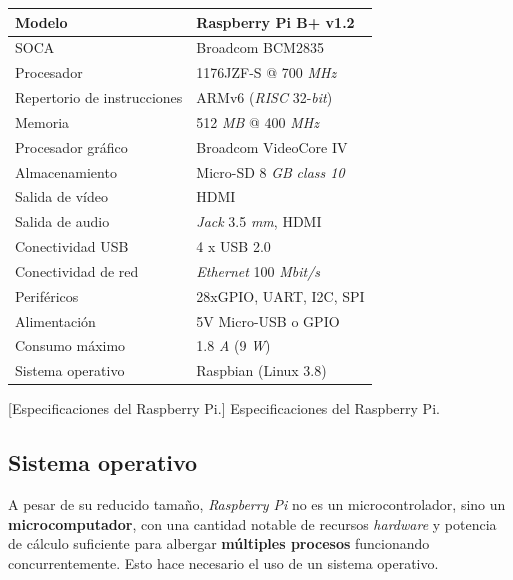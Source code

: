 \begin{center}
	\begin{tabular}{|l|l|}
		\hline Modelo & Raspberry Pi B+ v1.2 \\
		\hline \acrshort{SOCA} & Broadcom BCM2835 \\
		\hline Procesador &  1176JZF-S @ 700 \textit{MHz} \\
		\hline Repertorio de instrucciones & ARMv6 (\textit{RISC} 32-\textit{bit}) \\
		\hline Memoria & 512 \textit{MB} @ 400 \textit{MHz} \\
		\hline Procesador gráfico & Broadcom VideoCore IV \\ 		
		\hline Almacenamiento & Micro-\acrshort{SD} 8 \textit{GB} \textit{class 10} \\
		\hline Salida de vídeo & \acrshort{HDMI} \\
		\hline Salida de audio & \textit{Jack} 3.5 \textit{mm}, \acrshort{HDMI} \\
		\hline Conectividad USB & 4 x \acrshort{USB} 2.0 \\
		\hline Conectividad de red & \textit{Ethernet} 100 \textit{Mbit/s} \\
		\hline Periféricos & 28xGPIO, \acrshort{UART}, \acrshort{I2C}, \acrshort{SPI} \\ 
		\hline Alimentación & 5V Micro-\acrshort{USB} o \acrshort{GPIO} \\
		\hline Consumo máximo & 1.8 \textit{A} (9 \textit{W}) \\ 
		\hline Sistema operativo & Raspbian (Linux 3.8) \\
		\hline 
	\end{tabular}
	\smallskip
	[Especificaciones del Raspberry Pi.]{\label{tab:rapberry} Especificaciones del Raspberry Pi. \cite{raspberry}}

\end{center}

\smallskip

\subsection{Sistema operativo}

A pesar de su reducido tamaño, \textit{Raspberry Pi} no es un microcontrolador, sino un \textbf{microcomputador}, con una cantidad notable de recursos \textit{hardware} y potencia de cálculo suficiente para albergar \textbf{múltiples procesos} funcionando concurrentemente. Esto hace necesario el uso de un sistema operativo.

